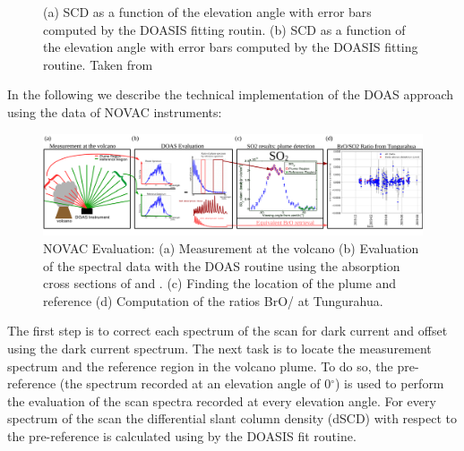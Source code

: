 \begin{figure}
	\caption{(a)  SCD as a function of the elevation angle with error bars computed by the DOASIS fitting routin. (b)  SCD as a function of the elevation angle with error bars computed by the DOASIS fitting routine.  Taken from \cite{WarnachSimon}}
	\label{fig:plumeref}
\end{figure}
%
In the following we describe the technical implementation of the DOAS approach using the data of NOVAC instruments:\\
\begin{figure}
	\centering
	\includegraphics[width=1\linewidth]{Bilder/NOVAC_Eval}
	\caption{NOVAC Evaluation: (a) Measurement at the volcano (b) Evaluation of the spectral data with the DOAS routine using the absorption cross sections of   and . (c) Finding the location of the plume and reference (d) Computation of the ratios BrO/ at Tungurahua. }
	\label{fig:NOVAC_Eval}
\end{figure}
%
The first step is to correct each spectrum of the scan for dark current and offset using the dark current spectrum.
The next task is to locate the measurement spectrum and the reference region in the volcano plume. 
To do so, the pre-reference (the spectrum recorded at an elevation angle of  0$^{\circ} $) is used to perform the evaluation of the scan spectra recorded at every elevation angle.
For every spectrum of the scan the  differential slant column density (dSCD) with respect to the pre-reference is calculated using  by the DOASIS fit routine.

